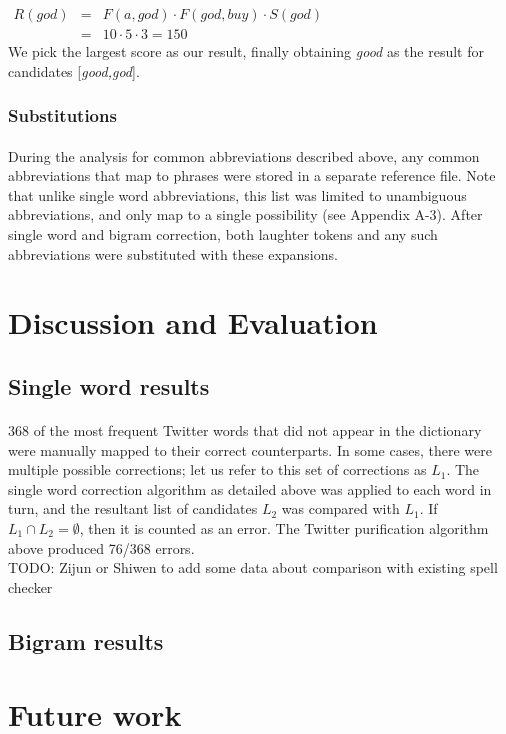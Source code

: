 \documentclass[twocolumn,10pt]{article}
\begin{document}
$\begin{array}{lcr}
R(god)&=&F(a,god)\cdot F(god,buy)\cdot S(god)\\
&=& 10\cdot5\cdot3=150\end{array}$\\
We pick the largest score as our result, finally obtaining \textit{good} as the result for candidates [\textit{good,god}]. 
\subsubsection*{Substitutions}
\paragraph{} During the analysis for common abbreviations described above, any common abbreviations that map to phrases were stored in a separate reference file. Note that unlike single word abbreviations, this list was limited to unambiguous abbreviations, and only map to a single possibility (see Appendix A-3). After single word and bigram correction, both laughter tokens and any such abbreviations were substituted with these expansions.
\section*{Discussion and Evaluation}
\subsection*{Single word results}
\paragraph{} 368 of the most frequent Twitter words that did not appear in the dictionary were manually mapped to their correct counterparts. In some cases, there were multiple possible corrections; let us refer to this set of corrections as $L_1$. The single word correction algorithm as detailed above was applied to each word in turn, and the resultant list of candidates $L_2$ was compared with $L_1$. If $L_1\cap L_2 = \emptyset$, then it is counted as an error. The Twitter purification algorithm above produced 76/368 errors.
\\
TODO: Zijun or Shiwen to add some data about comparison with existing spell checker
\subsection*{Bigram results}
\section*{Future work}
\end{document}
